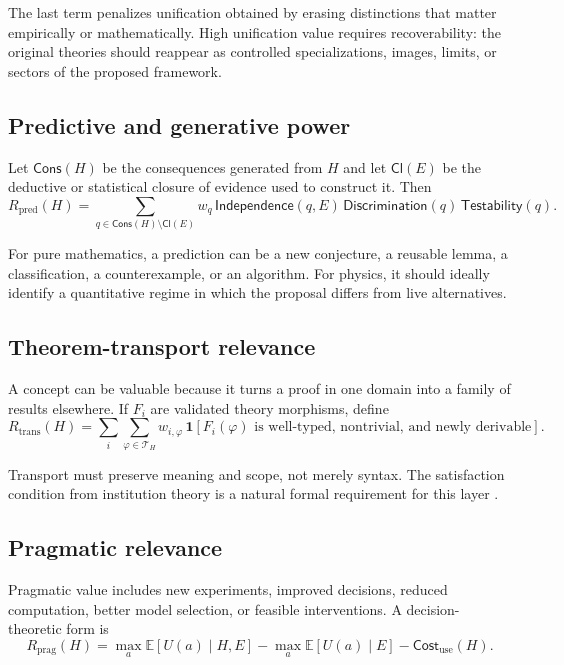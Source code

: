 \documentclass[11pt]{article}
\newcommand{\Cl}{\mathsf{Cl}}
\newcommand{\Cost}{\mathsf{Cost}}
\begin{document}
The last term penalizes unification obtained by erasing distinctions that matter empirically or
mathematically. High unification value requires recoverability: the original theories should reappear as
controlled specializations, images, limits, or sectors of the proposed framework.

\subsection{Predictive and generative power}

Let $\mathsf{Cons}(H)$ be the consequences generated from $H$ and let $\Cl(E)$ be the deductive or
statistical closure of evidence used to construct it. Then
\begin{equation}
R_{\mathrm{pred}}(H)
=\sum_{q\in\mathsf{Cons}(H)\setminus\Cl(E)}
w_q\,\mathsf{Independence}(q,E)\,
\mathsf{Discrimination}(q)\,
\mathsf{Testability}(q).
\end{equation}

For pure mathematics, a prediction can be a new conjecture, a reusable lemma, a classification, a
counterexample, or an algorithm. For physics, it should ideally identify a quantitative regime in which
the proposal differs from live alternatives.

\subsection{Theorem-transport relevance}

A concept can be valuable because it turns a proof in one domain into a family of results elsewhere.
If $F_i$ are validated theory morphisms, define
\begin{equation}
R_{\mathrm{trans}}(H)
=\sum_i\sum_{\varphi\in\mathcal{T}_H}
w_{i,\varphi}\,
\mathbf{1}\!\left[
F_i(\varphi)\text{ is well-typed, nontrivial, and newly derivable}
\right].
\end{equation}

Transport must preserve meaning and scope, not merely syntax. The satisfaction condition from
institution theory is a natural formal requirement for this layer \cite{goguenburstall1992}.

\subsection{Pragmatic relevance}

Pragmatic value includes new experiments, improved decisions, reduced computation, better model
selection, or feasible interventions. A decision-theoretic form is
\begin{equation}
R_{\mathrm{prag}}(H)
=
\max_a\mathbb{E}[U(a)\mid H,E]
-\max_a\mathbb{E}[U(a)\mid E]
-\Cost_{\mathrm{use}}(H).
\end{equation}
\end{document}
